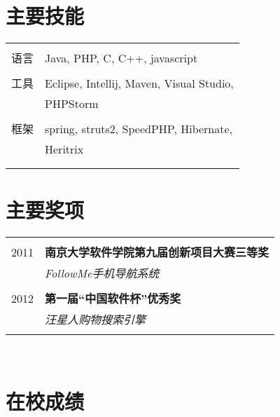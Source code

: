 \documentclass[10pt]{article} %
\begin{document}
{\begin{minipage}[t]{0.44\textwidth}
\section{主要技能} 

\begin{tabular}{rl}
& \\
语言
& Java, PHP, C, C++, javascript\\ 
& \\
工具
& Eclipse, Intellij, Maven, Visual Studio,\\
& PHPStorm\\
& \\
框架
& spring, struts2, SpeedPHP, Hibernate,\\
& Heritrix \\
& \\ \\
\end{tabular}


\section{主要奖项} 

\begin{tabular}{rl}
& \\
2011	 & \textbf{南京大学软件学院第九届创新项目大赛三等奖}\\
& \textit{FollowMe手机导航系统}\\ \\


2012	 & \textbf{第一届“中国软件杯”优秀奖}\\
& \textit{汪星人购物搜索引擎}\\ 
& \\
\end{tabular}\\[10pt]



\section{在校成绩} 


\end{minipage}}
\end{document}
